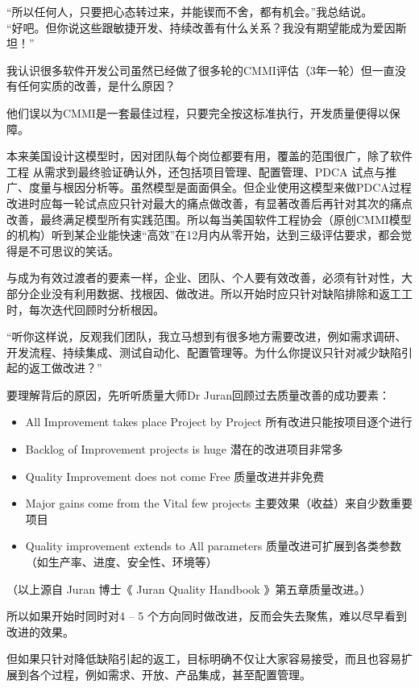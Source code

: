 ``所以任何人，只要把心态转过来，并能锲而不舍，都有机会。''我总结说。\\
``好吧。但你说这些跟敏捷开发、持续改善有什么关系？我没有期望能成为爱因斯坦！''

我认识很多软件开发公司虽然已经做了很多轮的CMMI评估（3年一轮）但一直没有任何实质的改善，是什么原因？

他们误以为CMMI是一套最佳过程，只要完全按这标准执行，开发质量便得以保障。

本来美国设计这模型时，因对团队每个岗位都要有用，覆盖的范围很广，除了软件工程
从需求到最终验证确认外，还包括项目管理、配置管理、PDCA
试点与推广、度量与根因分析等。虽然模型是面面俱全。但企业使用这模型来做PDCA过程改进时应每一轮试点应只针对最大的痛点做改善，有显著改善后再针对其次的痛点改善，最终满足模型所有实践范围。所以每当美国软件工程协会（原创CMMI模型的机构）听到某企业能快速``高效''在12月内从零开始，达到三级评估要求，都会觉得是不可思议的笑话。

与成为有效过渡者的要素一样，企业、团队、个人要有效改善，必须有针对性，大部分企业没有利用数据、找根因、做改进。所以开始时应只针对缺陷排除和返工工时，每次迭代回顾时分析根因。

``听你这样说，反观我们团队，我立马想到有很多地方需要改进，例如需求调研、开发流程、持续集成、测试自动化、配置管理等。为什么你提议只针对减少缺陷引起的返工做改进？''

要理解背后的原因，先听听质量大师Dr Juran回顾过去质量改善的成功要素：

\begin{itemize}
\tightlist
\item
  All Improvement takes place Project by Project
  所有改进只能按项目逐个进行
\item
  Backlog of Improvement projects is huge 潜在的改进项目非常多
\item
  Quality Improvement does not come Free 质量改进并非免费
\item
  Major gains come from the Vital few projects
  主要效果（收益）来自少数重要项目
\item
  Quality improvement extends to All parameters 质量改进可扩展到各类参数
  （如生产率、进度、安全性、环境等）
\end{itemize}

（以上源自 Juran 博士《 Juran Quality Handbook 》第五章质量改进。）

所以如果开始时同时对4 -- 5
个方向同时做改进，反而会失去聚焦，难以尽早看到改进的效果。

但如果只针对降低缺陷引起的返工，目标明确不仅让大家容易接受，而且也容易扩展到各个过程，例如需求、开放、产品集成，甚至配置管理。


